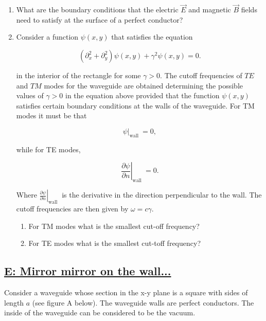 \begin{enumerate}
	\item What are the boundary conditions that the electric $\vec{E}$ and magnetic $\vec{B}$ fields need to
	satisfy at the surface of a perfect conductor?
	\item Consider a function $\psi(x, y)$ that satisfies the equation
	
	\begin{equation}
		\left(\partial_{x}^{2}+\partial_{y}^{2}\right) \psi(x, y)+\gamma^{2} \psi(x, y)=0.
	\end{equation}

	in the interior of the rectangle for some $\gamma>0 .$ The cutoff frequencies of $T E$ and $T M$ modes for the waveguide are obtained determining the possible values of $\gamma>0$ in the equation above provided that the function $\psi(x, y)$ satisfies certain boundary conditions at the walls of the waveguide. For TM modes it must be that

	\begin{equation}
		\left.\psi\right|_{\text {wall }}=0,
	\end{equation}

	while for TE modes,

	\begin{equation}
		\left.\frac{\partial \psi}{\partial n}\right|_{\text {wall }}=0.
	\end{equation}

	Where $\left.\frac{\partial \psi}{\partial n}\right|_{\text {wall }}$ is the derivative in the direction perpendicular to the wall. The cutoff frequencies are then given by $\omega=c \gamma$.

	\begin{enumerate}
		\item For TM modes what is the smallest cut-off frequency?
		\item  For TE modes what is the smallest cut-toff frequency?
	\end{enumerate}

\end{enumerate}

\subsection{\hyperref[E: Mirror mirror on the wall...]{E: Mirror mirror on the wall...}}

Consider a waveguide whose section in the x-y plane is a square with sides of length $a$ (see figure A below). The waveguide walls are perfect conductors. The inside of the waveguide can be considered to be the vacuum.

